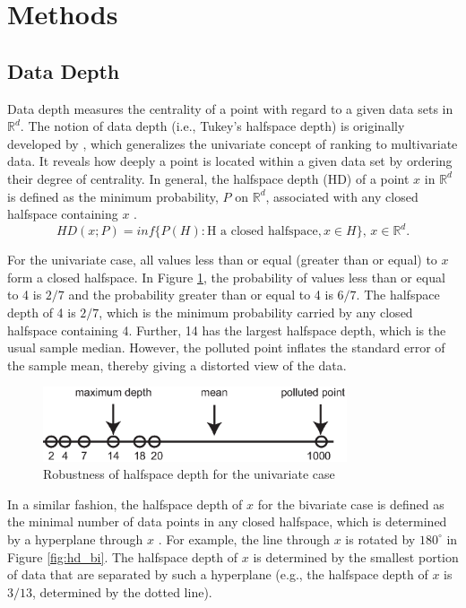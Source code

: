 \documentclass[a4paper,UKenglish]{lipics-v2016}
\begin{document}
\section{Methods}
\label{sec:methods}

\subsection{Data Depth}
Data depth measures the centrality of a point with regard to a given data sets in $\mathbb{R}^d$.
The notion of data depth (i.e., Tukey's halfspace depth) is originally developed by \cite{tukey75ICM}, which generalizes the univariate concept of ranking to multivariate data.
It reveals how deeply a point is located within a given data set by ordering their degree of centrality. 
In general, the halfspace depth (HD) of a point $x$ in  $\mathbb{R}^d$ is defined as the minimum probability, $P$ on  $\mathbb{R}^d$, associated with any closed halfspace containing $x$ \cite{liu00AS}. 
\begin{equation*}\label{eq:hd}
HD(x;P) = inf\{P(H): \text{H a closed halfspace}, x \in H\}\text{, } x \in \mathbb{R}^d.
\end{equation*}

For the univariate case, all values less than or equal (greater than or equal) to $x$ form a closed halfspace. 
In Figure \ref{fig:hd_uni}, the probability of values less than or equal to 4 is  $2/7$ and the probability greater than or equal to 4 is $6/7$. 
The halfspace depth of 4 is $2/7$, which is the minimum probability carried by any closed halfspace containing 4. 
Further, 14 has the largest halfspace depth, which is the usual sample median. 
However, the polluted point inflates the standard error of the sample mean, thereby giving a distorted view of the data. 

\begin{figure}
	\centering
	\includegraphics[width=0.8\textwidth]{images/depth_uni.eps}
	\caption{Robustness of halfspace depth for the univariate case}
	\label{fig:hd_uni}	
\end{figure}

In a similar fashion, the halfspace depth of $x$ for the bivariate case is defined as the minimal number of data points in any closed halfspace, which is determined by a hyperplane through $x$ \cite{rousseeuw96RSS}. For example, the line through $x$ is rotated by $180^{\circ}$ in Figure \ref{fig:hd_bi}. The halfspace depth of $x$ is determined by the smallest portion of data that are separated by such a hyperplane (e.g.,  the halfspace depth of $x$ is $3/13$, determined by the dotted line).
 
\end{document}
